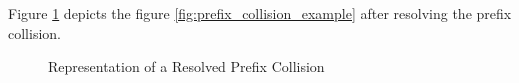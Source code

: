 Figure \ref{fig:prefix_collision_example_renamed} depicts the figure \ref{fig:prefix_collision_example} after resolving the prefix collision.

\begin{figure}[H]
    \caption{Representation of a Resolved Prefix Collision}
    \label{fig:prefix_collision_example_renamed}
\end{figure}







